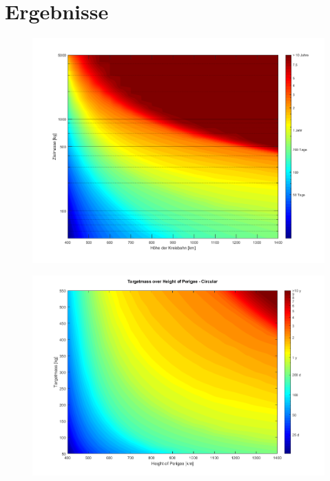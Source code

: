 

\section{Ergebnisse}

\begin{figure}
\centering
\includegraphics[width=1.00\textwidth]{./graphics/GMAT/GMAT_Mass_over_Height.png}
\label{fig:mass_over_height}
\end{figure}

\begin{figure}[h]
	\centering
		\includegraphics[width=1.00\textwidth]{./graphics/GMAT/GMAT_Mass_over_Height_550.png}
	\label{fig:GMAT_Mass_over_Height_550}
\end{figure}

